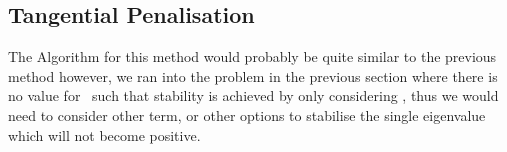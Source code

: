 


\subsection{Tangential Penalisation}

The Algorithm for this method would probably be quite similar to the previous method however, we ran into the problem in the previous section where there is no value for \mgamma~such that stability is achieved by only considering , thus we would need to consider other term, or other options to stabilise the single eigenvalue which will not become positive.